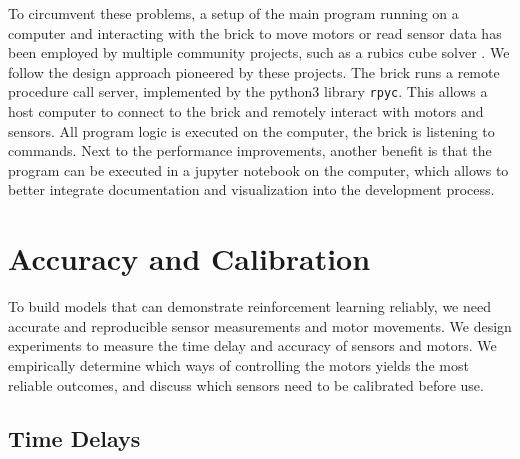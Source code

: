 \documentclass[11pt, a4paper]{article}
\begin{document}
To circumvent these problems, a setup of the main program running on a computer and interacting with the brick to move motors or read sensor data has been employed by multiple community projects, such as a rubics cube solver \cite{ev3_rubics}. We follow the design approach pioneered by these projects. The brick runs a remote procedure call server, implemented by the python3 library \texttt{rpyc}. This allows a host computer to connect to the brick and remotely interact with motors and sensors. All program logic is executed on the computer, the brick is listening to commands. Next to the performance improvements, another benefit is that the program can be executed in a jupyter notebook on the computer, which allows to better integrate documentation and visualization into the development process.

\section{Accuracy and Calibration}
To build models that can demonstrate reinforcement learning reliably, we need accurate and reproducible sensor measurements and motor movements. We design experiments to measure the time delay and accuracy of sensors and motors. We empirically determine which ways of controlling the motors yields the most reliable outcomes, and discuss which sensors need to be calibrated before use. 
\subsection{Time Delays}
\end{document}
